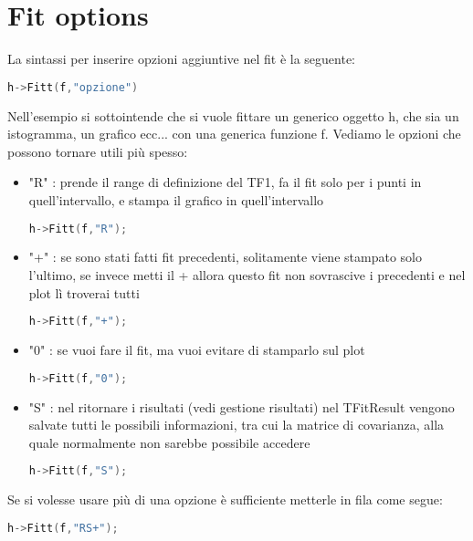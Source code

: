 \section{Fit options}
La sintassi per inserire opzioni aggiuntive nel fit è la seguente:
\begin{lstlisting}[language=C++,label={cod1},mathescape=true,breaklines=true]
	h->Fitt(f,"opzione")
\end{lstlisting}
Nell'esempio si sottointende che si vuole fittare un generico oggetto h, che sia un istogramma, un grafico ecc... con una generica funzione f. Vediamo le opzioni che possono tornare utili più spesso:
\begin{itemize}
	\item "R" : prende il range di definizione del TF1, fa il fit solo per i punti in quell'intervallo, e stampa il grafico in quell'intervallo
\begin{lstlisting}[language=C++,label={cod1},mathescape=true,breaklines=true]
	h->Fitt(f,"R");
\end{lstlisting}
	\item "+" : se sono stati fatti fit precedenti, solitamente viene stampato solo l'ultimo, se invece metti il + allora questo fit non sovrascive i precedenti e nel plot lì troverai tutti
\begin{lstlisting}[language=C++,label={cod1},mathescape=true,breaklines=true]
h->Fitt(f,"+");
\end{lstlisting}
	\item "0" : se vuoi fare il fit, ma vuoi evitare di stamparlo sul plot
\begin{lstlisting}[language=C++,label={cod1},mathescape=true,breaklines=true]
	h->Fitt(f,"0");
\end{lstlisting}
	\item "S" : nel ritornare i risultati (vedi gestione risultati) nel TFitResult vengono salvate tutti le possibili informazioni, tra cui la matrice di covarianza, alla quale normalmente non sarebbe possibile accedere
\begin{lstlisting}[language=C++,label={cod1},mathescape=true,breaklines=true]
	h->Fitt(f,"S");
\end{lstlisting}
\end{itemize}
Se si volesse usare più di una opzione è sufficiente metterle in fila come segue:
\begin{lstlisting}[language=C++,label={cod1},mathescape=true,breaklines=true]
	h->Fitt(f,"RS+");
\end{lstlisting}
